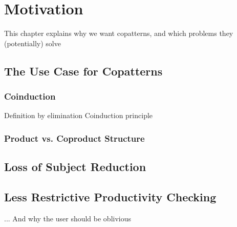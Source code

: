 \chapter{Motivation}
This chapter explains why we want copatterns, and which problems they (potentially) solve

\section{The Use Case for Copatterns}
\label{sec:motivation_copatterns}
\subsection{Coinduction}
Definition by elimination
Coinduction principle

\subsection{Product vs. Coproduct Structure}

\section{Loss of Subject Reduction}

\section{Less Restrictive Productivity Checking}
... And why the user should be oblivious

